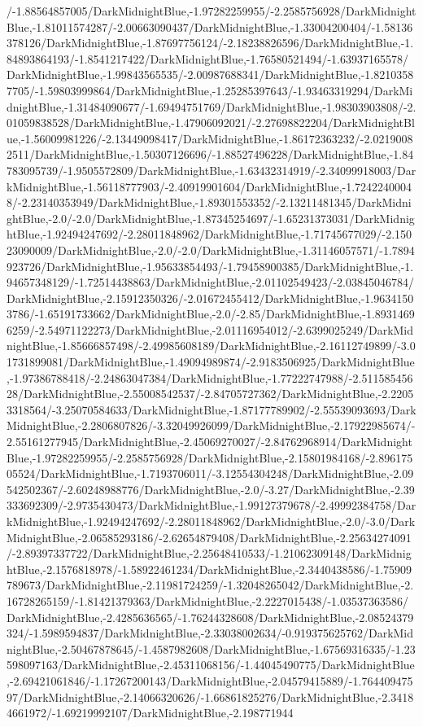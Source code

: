 {\begin{tikzternal}
/-1.88564857005/DarkMidnightBlue,-1.97282259955/-2.2585756928/DarkMidnightBlue,-1.81011574287/-2.00663090437/DarkMidnightBlue,-1.33004200404/-1.58136378126/DarkMidnightBlue,-1.87697756124/-2.18238826596/DarkMidnightBlue,-1.84893864193/-1.8541217422/DarkMidnightBlue,-1.76580521494/-1.63937165578/DarkMidnightBlue,-1.99843565535/-2.00987688341/DarkMidnightBlue,-1.82103587705/-1.59803999864/DarkMidnightBlue,-1.25285397643/-1.93463319294/DarkMidnightBlue,-1.31484090677/-1.69494751769/DarkMidnightBlue,-1.98303903808/-2.01059838528/DarkMidnightBlue,-1.47906092021/-2.27698822204/DarkMidnightBlue,-1.56009981226/-2.13449098417/DarkMidnightBlue,-1.86172363232/-2.02190082511/DarkMidnightBlue,-1.50307126696/-1.88527496228/DarkMidnightBlue,-1.84783095739/-1.9505572809/DarkMidnightBlue,-1.63432314919/-2.34099918003/DarkMidnightBlue,-1.56118777903/-2.40919901604/DarkMidnightBlue,-1.72422400048/-2.23140353949/DarkMidnightBlue,-1.89301553352/-2.13211481345/DarkMidnightBlue,-2.0/-2.0/DarkMidnightBlue,-1.87345254697/-1.65231373031/DarkMidnightBlue,-1.92494247692/-2.28011848962/DarkMidnightBlue,-1.71745677029/-2.15023090009/DarkMidnightBlue,-2.0/-2.0/DarkMidnightBlue,-1.31146057571/-1.7894923726/DarkMidnightBlue,-1.95633854493/-1.79458900385/DarkMidnightBlue,-1.94657348129/-1.72514438863/DarkMidnightBlue,-2.01102549423/-2.03845046784/DarkMidnightBlue,-2.15912350326/-2.01672455412/DarkMidnightBlue,-1.96341503786/-1.65191733662/DarkMidnightBlue,-2.0/-2.85/DarkMidnightBlue,-1.89314696259/-2.54971122273/DarkMidnightBlue,-2.01116954012/-2.6399025249/DarkMidnightBlue,-1.85666857498/-2.49985608189/DarkMidnightBlue,-2.16112749899/-3.01731899081/DarkMidnightBlue,-1.49094989874/-2.9183506925/DarkMidnightBlue,-1.97386788418/-2.24863047384/DarkMidnightBlue,-1.77222747988/-2.51158545628/DarkMidnightBlue,-2.55008542537/-2.84705727362/DarkMidnightBlue,-2.22053318564/-3.25070584633/DarkMidnightBlue,-1.87177789902/-2.55539093693/DarkMidnightBlue,-2.2806807826/-3.32049926099/DarkMidnightBlue,-2.17922985674/-2.55161277945/DarkMidnightBlue,-2.45069270027/-2.84762968914/DarkMidnightBlue,-1.97282259955/-2.2585756928/DarkMidnightBlue,-2.15801984168/-2.89617505524/DarkMidnightBlue,-1.7193706011/-3.12554304248/DarkMidnightBlue,-2.09542502367/-2.60248988776/DarkMidnightBlue,-2.0/-3.27/DarkMidnightBlue,-2.39333692309/-2.9735430473/DarkMidnightBlue,-1.99127379678/-2.49992384758/DarkMidnightBlue,-1.92494247692/-2.28011848962/DarkMidnightBlue,-2.0/-3.0/DarkMidnightBlue,-2.06585293186/-2.62654879408/DarkMidnightBlue,-2.25634274091/-2.89397337722/DarkMidnightBlue,-2.25648410533/-1.21062309148/DarkMidnightBlue,-2.1576818978/-1.58922461234/DarkMidnightBlue,-2.3440438586/-1.75909789673/DarkMidnightBlue,-2.11981724259/-1.32048265042/DarkMidnightBlue,-2.16728265159/-1.81421379363/DarkMidnightBlue,-2.2227015438/-1.03537363586/DarkMidnightBlue,-2.4285636565/-1.76244328608/DarkMidnightBlue,-2.08524379324/-1.5989594837/DarkMidnightBlue,-2.33038002634/-0.919375625762/DarkMidnightBlue,-2.50467878645/-1.4587982608/DarkMidnightBlue,-1.67569316335/-1.23598097163/DarkMidnightBlue,-2.45311068156/-1.44045490775/DarkMidnightBlue,-2.69421061846/-1.17267200143/DarkMidnightBlue,-2.04579415889/-1.76440947597/DarkMidnightBlue,-2.14066320626/-1.66861825276/DarkMidnightBlue,-2.34184661972/-1.69219992107/DarkMidnightBlue,-2.198771944
\end{tikzternal}}
